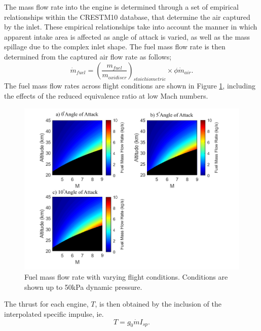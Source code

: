 The mass flow rate into the engine is determined through a set of empirical relationships within the \textsf{CRESTM10} database, that determine the air captured by the inlet. These empirical relationships take into account the manner in which apparent intake area is affected as angle of attack is varied, as well as the mass spillage due to the complex inlet shape. The fuel mass flow rate is then determined from the captured air flow rate as follows; 
\begin{equation}
\dot{m}_{fuel} = (\dfrac{m_{fuel}}{m_{oxidiser}} )_{stoichiometric} \times \phi \dot{m}_{air}.
\end{equation}
 The fuel mass flow rates across flight conditions are shown in Figure \ref{fig:FuelMassFlowStandard}, including the effects of the reduced equivalence ratio at low Mach numbers.
\begin{figure}[ht]
	\centering
	\includegraphics[width=0.85\linewidth]{figures/3_vehicle_design/FuelMassFlowStandard}
	\caption{Fuel mass flow rate with varying flight conditions. Conditions are shown up to 50kPa dynamic pressure.}
	\label{fig:FuelMassFlowStandard}
\end{figure}
\noindent
The thrust for each engine, $T$, is then obtained by the inclusion of the interpolated specific impulse, ie. 
\begin{equation}
T = g_0\dot{m}I_{sp}. 
\end{equation}



